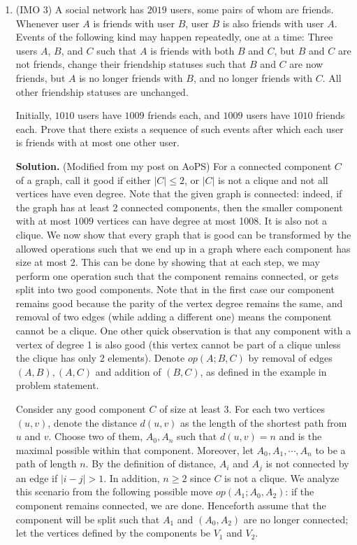 \documentclass[11pt,a4paper]{article}
\begin{document}
\begin{enumerate}
	Consider, now, any door that joins two opposite regions, and the two side regions. One side region is outside the cycle; the other is inside, contradicting that no region can be enclosed by the cycle. Therefore there's no cycle to start with, as desired. 
	
	
	\item [\textbf{C5}.] (IMO 3) A social network has $2019$ users, some pairs of whom are friends. Whenever user $A$ is friends with user $B$, user $B$ is also friends with user $A$. Events of the following kind may happen repeatedly, one at a time:
	Three users $A$, $B$, and $C$ such that $A$ is friends with both $B$ and $C$, but $B$ and $C$ are not friends, change their friendship statuses such that $B$ and $C$ are now friends, but $A$ is no longer friends with $B$, and no longer friends with $C$. All other friendship statuses are unchanged.
	
	Initially, $1010$ users have $1009$ friends each, and $1009$ users have $1010$ friends each. Prove that there exists a sequence of such events after which each user is friends with at most one other user.
	
	\textbf{Solution.} (Modified from my post on AoPS) For a connected component $C$ of a graph, call it good if either $|C|\le 2$, or $|C|$ is not a clique and not all vertices have even degree. 
	Note that the given graph is connected: 
	indeed, if the graph has at least 2 connected components, then the smaller component with at most $1009$ vertices can have degree at most 1008.
	It is also not a clique.
	We now show that every graph that is good can be transformed by the allowed operations such that we end up in a graph where each component has size at most 2. 
	This can be done by showing that at each step, we may perform one operation such that the component remains connected, 
	or gets split into two good components. 
	Note that in the first case our component remains good because the parity of the vertex degree remains the same, 
	and removal of two edges (while adding a different one) means the component cannot be a clique. 
	One other quick observation is that any component with a vertex of degree 1 is also good (this vertex cannot be part of a clique unless the clique has only 2 elements). 
	Denote $op(A;B,C)$ by removal of edges $(A, B), (A, C)$ and addition of $(B, C)$, as defined in the example in problem statement. 
	
	Consider any good component $C$ of size at least 3. For each two vertices $(u, v)$, denote the distance $d(u, v)$ as the length of the shortest path from $u$ and $v$. 
	Choose two of them, $A_0, A_n$ such that $d(u, v)=n$ and is the maximal possible within that component. Moreover, let $A_0, A_1, \cdots , A_n$ to be a path of length $n$. By the definition of distance, $A_i$ and $A_j$ is not connected by an edge if $|i-j|>1$. In addition, $n\ge 2$ since $C$ is not a clique.
	We analyze this scenario from the following possible move $op(A_1; A_0, A_2)$: 
	if the component remains connected, we are done. Henceforth assume that the component will be split such that $A_1$ and $(A_0, A_2)$ are no longer connected; 
	let the vertices defined by the components be $V_1$ and $V_2$. 
	

\end{enumerate}
\end{document}
